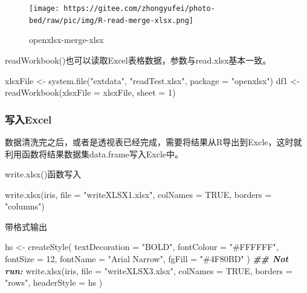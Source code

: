 \documentclass[
]{book}
\newenvironment{Shaded}{\begin{snugshade}}{\end{snugshade}}
\newcommand{\AttributeTok}[1]{\textcolor[rgb]{0.77,0.63,0.00}{#1}}
\newcommand{\ConstantTok}[1]{\textcolor[rgb]{0.00,0.00,0.00}{#1}}
\newcommand{\DecValTok}[1]{\textcolor[rgb]{0.00,0.00,0.81}{#1}}
\newcommand{\DocumentationTok}[1]{\textcolor[rgb]{0.56,0.35,0.01}{\textbf{\textit{#1}}}}
\newcommand{\FunctionTok}[1]{\textcolor[rgb]{0.00,0.00,0.00}{#1}}
\newcommand{\NormalTok}[1]{#1}
\newcommand{\OtherTok}[1]{\textcolor[rgb]{0.56,0.35,0.01}{#1}}
\newcommand{\StringTok}[1]{\textcolor[rgb]{0.31,0.60,0.02}{#1}}
\begin{document}
\begin{figure}
\centering
\texttt{[image: https://gitee.com/zhongyufei/photo-bed/raw/pic/img/R-read-merge-xlsx.png]}
\caption{openxlsx-merge-xlsx}
\end{figure}

readWorkbook()也可以读取Excel表格数据，参数与read.xlsx基本一致。

\begin{Shaded}
\begin{Highlighting}[]
\NormalTok{xlsxFile }\OtherTok{\textless{}{-}} \FunctionTok{system.file}\NormalTok{(}\StringTok{"extdata"}\NormalTok{, }\StringTok{"readTest.xlsx"}\NormalTok{, }\AttributeTok{package =} \StringTok{"openxlsx"}\NormalTok{)}
\NormalTok{df1 }\OtherTok{\textless{}{-}} \FunctionTok{readWorkbook}\NormalTok{(}\AttributeTok{xlsxFile =}\NormalTok{ xlsxFile, }\AttributeTok{sheet =} \DecValTok{1}\NormalTok{)}
\end{Highlighting}
\end{Shaded}

\hypertarget{openxlsx:write-function}{%
\subsubsection{写入Excel}\label{openxlsx:write-function}}

数据清洗完之后，或者是透视表已经完成，需要将结果从R导出到Excle，这时就利用函数将结果数据集data.frame写入Excle中。

write.xlsx()函数写入

\begin{Shaded}
\begin{Highlighting}[]
\FunctionTok{write.xlsx}\NormalTok{(iris, }\AttributeTok{file =} \StringTok{"writeXLSX1.xlsx"}\NormalTok{, }\AttributeTok{colNames =} \ConstantTok{TRUE}\NormalTok{, }\AttributeTok{borders =} \StringTok{"columns"}\NormalTok{)}
\end{Highlighting}
\end{Shaded}

带格式输出

\begin{Shaded}
\begin{Highlighting}[]
\NormalTok{hs }\OtherTok{\textless{}{-}} \FunctionTok{createStyle}\NormalTok{(}
  \AttributeTok{textDecoration =} \StringTok{"BOLD"}\NormalTok{, }\AttributeTok{fontColour =} \StringTok{"\#FFFFFF"}\NormalTok{, }\AttributeTok{fontSize =} \DecValTok{12}\NormalTok{,}
  \AttributeTok{fontName =} \StringTok{"Arial Narrow"}\NormalTok{, }\AttributeTok{fgFill =} \StringTok{"\#4F80BD"}
\NormalTok{)}
\DocumentationTok{\#\# Not run: }
\FunctionTok{write.xlsx}\NormalTok{(iris,}
  \AttributeTok{file =} \StringTok{"writeXLSX3.xlsx"}\NormalTok{,}
  \AttributeTok{colNames =} \ConstantTok{TRUE}\NormalTok{, }\AttributeTok{borders =} \StringTok{"rows"}\NormalTok{, }\AttributeTok{headerStyle =}\NormalTok{ hs}
\NormalTok{)}
\end{Highlighting}
\end{Shaded}
\end{document}
